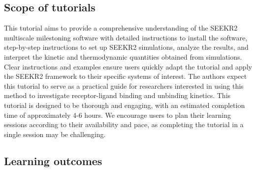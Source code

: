 \documentclass[9pt,training,pubversion]{livecoms}
\begin{document}
\subsection{Scope of tutorials}
\vspace{2mm}

\noindent This tutorial aims to provide a comprehensive understanding of the SEEKR2 multiscale milestoning software with detailed instructions to install the software, step-by-step instructions to set up SEEKR2 simulations, analyze the results, and interpret the kinetic and thermodynamic quantities obtained from simulations. Clear instructions and examples ensure users quickly adapt the tutorial and apply the SEEKR2 framework to their specific systems of interest. The authors expect this tutorial to serve as a practical guide for researchers interested in using this method to investigate receptor-ligand binding and unbinding kinetics. This tutorial is designed to be thorough and engaging, with an estimated completion time of approximately 4-6 hours. We encourage users to plan their learning sessions according to their availability and pace, as completing the tutorial in a single session may be challenging. \par


\subsection{Learning outcomes}
\vspace{2mm}
\end{document}
